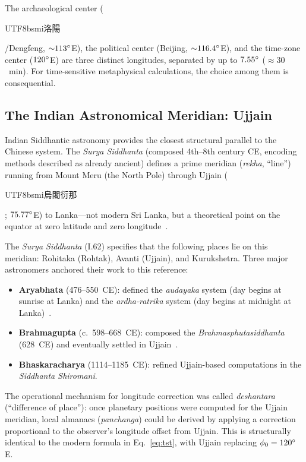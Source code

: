 \documentclass[10pt,a4paper]{article}
\newcommand{\zh}[1]{\begin{CJK}{UTF8}{bsmi}#1\end{CJK}}
\begin{document}
The archaeological center (\zh{洛陽}/Dengfeng, ${\sim}113\degree$E), the
political center (Beijing, ${\sim}116.4\degree$E), and the time-zone center
($120\degree$E) are three distinct longitudes, separated by up to $7.55\degree$
($\approx 30$~min). For time-sensitive metaphysical calculations, the choice
among them is consequential.

\subsection{The Indian Astronomical Meridian: Ujjain}
\label{subsec:ujjain}

Indian Siddhantic astronomy provides the closest structural parallel to
the Chinese system. The \textit{Surya Siddhanta} (composed 4th--8th century
CE, encoding methods described as already ancient) defines a prime meridian
(\textit{rekha}, ``line'') running from Mount Meru (the North Pole) through
Ujjain (\zh{烏闍衍那}; $75.77\degree$E) to Lanka---not modern Sri Lanka,
but a theoretical point on the equator at zero latitude and zero
longitude~\cite{burgess1860}.

The \textit{Surya Siddhanta} (I.62) specifies that the following places
lie on this meridian: Rohitaka (Rohtak), Avanti (Ujjain), and Kurukshetra.
Three major astronomers anchored their work to this reference:

\begin{itemize}[nosep]
  \item \textbf{Aryabhata} (476--550~CE): defined the \textit{audayaka}
    system (day begins at sunrise at Lanka) and the \textit{ardha-ratrika}
    system (day begins at midnight at Lanka)~\cite{shukla1976}.
  \item \textbf{Brahmagupta} (c.~598--668~CE): composed the
    \textit{Brahmasphutasiddhanta} (628~CE) and eventually settled in
    Ujjain~\cite{plofker2009}.
  \item \textbf{Bhaskaracharya} (1114--1185~CE): refined Ujjain-based
    computations in the \textit{Siddhanta Shiromani}.
\end{itemize}

The operational mechanism for longitude correction was called
\textit{deshantara} (``difference of place''): once planetary positions were
computed for the Ujjain meridian, local almanacs (\textit{panchanga}) could be
derived by applying a correction proportional to the observer's longitude
offset from Ujjain. This is structurally identical to the modern formula
in Eq.~\eqref{eq:tst}, with Ujjain replacing $\phi_0 = 120\degree$E.
\end{document}
